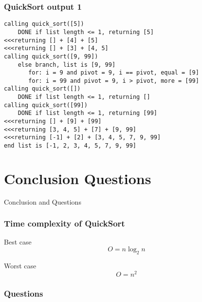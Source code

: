 \documentclass{beamer}
\begin{document}
    \begin{frame}[fragile]
        \frametitle{QuickSort output 1}
        \scriptsize
        \begin{verbatim}
calling quick_sort([5])
    DONE if list length <= 1, returning [5]
<<<returning [] + [4] + [5]
<<<returning [] + [3] + [4, 5]
calling quick_sort([9, 99])
    else branch, list is [9, 99]
       for: i = 9 and pivot = 9, i == pivot, equal = [9]
       for: i = 99 and pivot = 9, i > pivot, more = [99]
calling quick_sort([])
    DONE if list length <= 1, returning []
calling quick_sort([99])
    DONE if list length <= 1, returning [99]
<<<returning [] + [9] + [99]
<<<returning [3, 4, 5] + [7] + [9, 99]
<<<returning [-1] + [2] + [3, 4, 5, 7, 9, 99]
end list is [-1, 2, 3, 4, 5, 7, 9, 99]
        \end{verbatim}
    \end{frame}

\section{Conclusion Questions}
\begin{frame}
    \LARGE Conclusion and Questions
\end{frame}

    \begin{frame}
        \frametitle{Time complexity of QuickSort}
        \par Best case
        \begin{equation}
            O = n \log_2 n
        \end{equation}
        \par Worst case
        \begin{equation}
            O = n^2
        \end{equation}

    \end{frame}

%
%
%

    \begin{frame}
        \frametitle{Questions}

    \end{frame}
\end{document}
